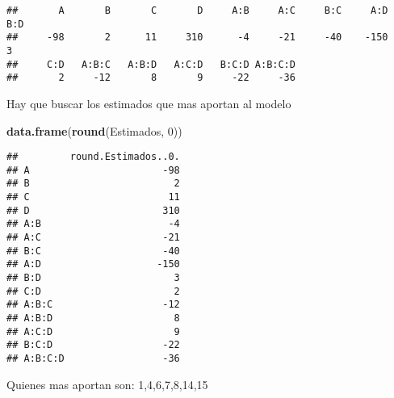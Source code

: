 \documentclass[]{article}
\newenvironment{Shaded}{\begin{snugshade}}{\end{snugshade}}
\newcommand{\CommentTok}[1]{\textcolor[rgb]{0.56,0.35,0.01}{\textit{#1}}}
\newcommand{\DataTypeTok}[1]{\textcolor[rgb]{0.13,0.29,0.53}{#1}}
\newcommand{\DecValTok}[1]{\textcolor[rgb]{0.00,0.00,0.81}{#1}}
\newcommand{\KeywordTok}[1]{\textcolor[rgb]{0.13,0.29,0.53}{\textbf{#1}}}
\newcommand{\NormalTok}[1]{#1}
\newcommand{\OperatorTok}[1]{\textcolor[rgb]{0.81,0.36,0.00}{\textbf{#1}}}
\newcommand{\StringTok}[1]{\textcolor[rgb]{0.31,0.60,0.02}{#1}}
\begin{document}
\begin{verbatim}
##       A       B       C       D     A:B     A:C     B:C     A:D     B:D 
##     -98       2      11     310      -4     -21     -40    -150       3 
##     C:D   A:B:C   A:B:D   A:C:D   B:C:D A:B:C:D 
##       2     -12       8       9     -22     -36
\end{verbatim}

Hay que buscar los estimados que mas aportan al modelo

\begin{Shaded}
\begin{Highlighting}[]
\KeywordTok{data.frame}\NormalTok{(}\KeywordTok{round}\NormalTok{(Estimados, }\DecValTok{0}\NormalTok{))}
\end{Highlighting}
\end{Shaded}

\begin{verbatim}
##         round.Estimados..0.
## A                       -98
## B                         2
## C                        11
## D                       310
## A:B                      -4
## A:C                     -21
## B:C                     -40
## A:D                    -150
## B:D                       3
## C:D                       2
## A:B:C                   -12
## A:B:D                     8
## A:C:D                     9
## B:C:D                   -22
## A:B:C:D                 -36
\end{verbatim}

Quienes mas aportan son: 1,4,6,7,8,14,15

\begin{Shaded}
\end{Shaded}
\end{document}
